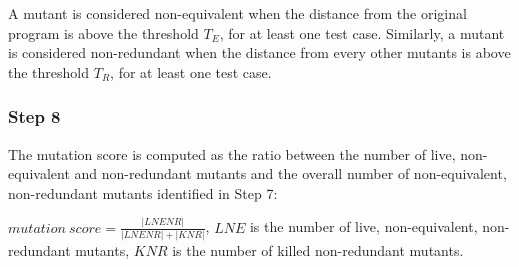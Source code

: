 A mutant is considered non-equivalent when the distance from the original program is above the threshold $T_E$, for at least one test case.
Similarly, a mutant is considered non-redundant when the distance from every other mutants is above the threshold $T_R$, for at least one test case.




\subsubsection{Step 8}

The mutation score is computed as the ratio between the number of live, non-equivalent and non-redundant mutants  and the overall number of non-equivalent, non-redundant mutants identified in Step 7:

$\mathit{mutation}\ \mathit{score} = \frac{|\mathit{LNENR}|}{|\mathit{LNENR}|+|\mathit{KNR}|}$,
$\mathit{LNE}$ is the number of live, non-equivalent, non-redundant mutants,
$\mathit{KNR}$ is the number of killed non-redundant mutants.

%
%
%
